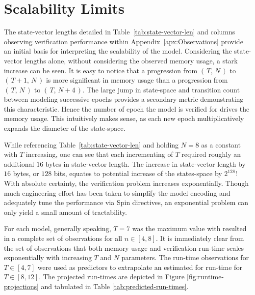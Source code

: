 \hypertarget{sec:scalability-limits}{%
\section{Scalability Limits}\label{sec:scalability-limits}}

The state-vector lengths detailed in Table\ \ref{tab:state-vector-len} and columns observing verification performance within Appendix\ \ref{apx:Observations} provide an initial basis for interpreting the scalability of the  model.
Considering the state-vector lengths alone, without considering the observed memory usage, a stark increase can be seen.
It is easy to notice that a progression from \( (\,T,\, N\,) \) to \( (\,T+1,\, N\,) \) is more significant in memory usage than a progression from \( (\,T,\, N\,) \) to \( (\,T,\, N+4\,) \).
The large jump in state-space and transition count between modeling successive epochs provides a secondary metric demonstrating this characteristic.
Hence the number of epoch the model is verified for drives the memory usage.
This intuitively makes sense, as each new epoch multiplicatively expands the diameter of the state-space.

While referencing Table\ \ref{tab:state-vector-len} and holding \(N = 8\) as a constant with \(T\) increasing, one can see that each incrementing of \(T\) required roughly an additional \(16\) bytes in state-vector length.
The increase in state-vector length by \(16\) bytes, or \(128\) bits, equates to potential increase of the states-space by \(2^{128}\)!
With absolute certainty, the verification problem increases exponentially.
Though much engineering effort has been taken to simplify the model encoding and adequately tune the performance via Spin directives, an exponential problem can only yield a small amount of tractability.

For each model, generally speaking, \(T = 7\) was the maximum value with resulted in a complete set of observations for all \(n \in [4, 8]\).
It is immediately clear from the set of observations that both memory usage and verification run-time scales exponentially with increasing \(T\) and \(N\) parameters.
The run-time observations for \(T \in [4, 7]\) were used as predictors to extrapolate an estimated for run-time for \(T \in [8, 12]\).
The projected run-times are depicted in Figure \ref{fig:runtime-projections} and tabulated in Table \ref{tab:predicted-run-times}.

